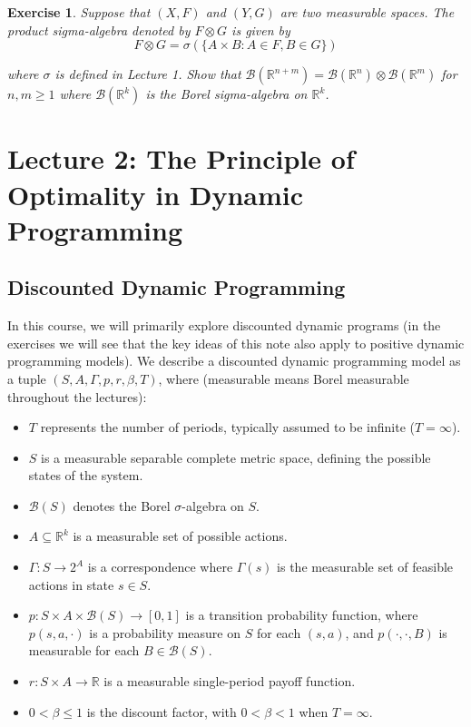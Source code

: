 \documentclass[letter,11pt]{article}
\newtheorem{exercise}{Exercise}[section]
\begin{document}
\begin{exercise}
    Suppose that $(X,F)$ and $(Y,G)$ are two measurable spaces. The product sigma-algebra denoted by $F \otimes G$ is given by 
    $$ F \otimes G = \sigma  ( \{ A \times B: A \in F, B \in G \} ) $$

where $\sigma$ is defined in Lecture 1. 
    Show that $\mathcal{B} (\mathbb{R}^{n+m}) =\mathcal{B} (\mathbb{R}^{n}) \otimes 
 \mathcal{B} (\mathbb{R}^{m})   $ for $n , m \geq 1$ 
where   $\mathcal{B} (\mathbb{R}^{k})$ is the Borel sigma-algebra on $\mathbb{R}^{k}$. 
\end{exercise}





\newpage


\section{Lecture 2: The Principle of Optimality in Dynamic Programming}





\subsection{Discounted Dynamic Programming}

In this course, we will primarily explore discounted dynamic programs (in the exercises we will see that the key ideas of this note also apply to positive dynamic programming models). We describe a discounted dynamic programming model as a tuple \((S, A, \Gamma, p, r, \beta, T)\), where (measurable means Borel measurable throughout the lectures):
\begin{itemize}
    \item \(T\) represents the number of periods, typically assumed to be infinite (\(T = \infty\)).
    \item \(S\) is a measurable separable complete metric space, defining the possible states of the system.
    \item \(\mathcal{B}(S)\) denotes the Borel \(\sigma\)-algebra on \(S\).
    \item \(A \subseteq \mathbb{R}^k\) is a measurable set of possible actions. 
    \item $\Gamma: S \rightarrow 2^{A}$ is a correspondence where \(\Gamma(s)\) is the  measurable set of feasible actions in state \(s \in S\).
    \item \(p: S \times A \times \mathcal{B}(S) \rightarrow [0, 1]\) is a transition probability function, where \(p(s, a, \cdot)\) is a probability measure on \(S\) for each \((s, a)\), and \(p(\cdot, \cdot, B)\) is measurable for each \(B \in \mathcal{B}(S)\).
    \item \(r: S \times A \rightarrow \mathbb{R}\) is a measurable single-period payoff function.
    \item \(0 < \beta \leq 1\) is the discount factor, with \(0 < \beta < 1\) when \(T = \infty\).
\end{itemize}
\end{document}
